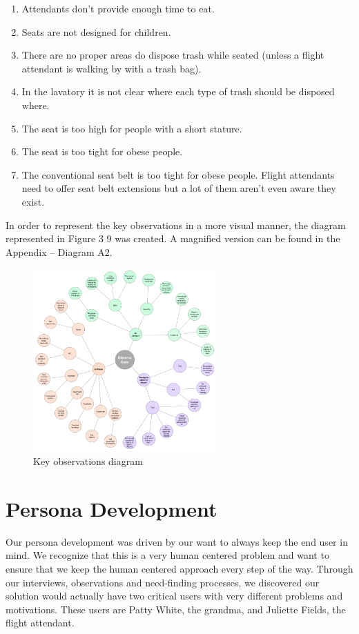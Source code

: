 \begin{enumerate}
  \item Attendants don’t provide enough time to eat. 
  \item Seats are not designed for children.
  \item There are no proper areas do dispose trash while seated (unless a flight attendant is walking by with a trash bag).
  \item In the lavatory it is not clear where each type of trash should be disposed where.
  \item The seat is too high for people with a short stature.
  \item The seat is too tight for obese people.
  \item The conventional seat belt is too tight for obese people. Flight attendants need to offer seat belt extensions but a lot of them aren’t even aware they exist.
\end{enumerate}

In order to represent the key observations in a more visual manner, the diagram represented in Figure 3 9 was created. A magnified version can be found in the Appendix – Diagram A2.

\begin{figure}[h]
  \centering
     \includegraphics[width=7cm]{images/image040}
   \caption{Key observations diagram}
  \label{fig:40}
\end{figure}

\section*{Persona Development}
Our persona development was driven by our want to always keep the end user in mind. We recognize that this is a very human centered problem and want to ensure that we keep the human centered approach every step of the way. Through our interviews, observations and need-finding processes, we discovered our solution would actually have two critical users with very different problems and motivations. These users are Patty White, the grandma, and Juliette Fields, the flight attendant.

